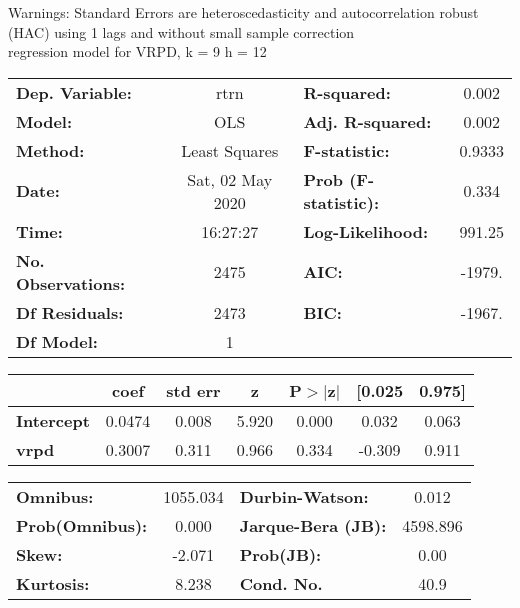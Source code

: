 Warnings: \newline
 [1] Standard Errors are heteroscedasticity and autocorrelation robust (HAC) using 1 lags and without small sample correction\\ 

regression model for VRPD, k = 9 h = 12\begin{center}
\begin{tabular}{lclc}
\toprule
\textbf{Dep. Variable:}    &       rtrn       & \textbf{  R-squared:         } &     0.002   \\
\textbf{Model:}            &       OLS        & \textbf{  Adj. R-squared:    } &     0.002   \\
\textbf{Method:}           &  Least Squares   & \textbf{  F-statistic:       } &    0.9333   \\
\textbf{Date:}             & Sat, 02 May 2020 & \textbf{  Prob (F-statistic):} &    0.334    \\
\textbf{Time:}             &     16:27:27     & \textbf{  Log-Likelihood:    } &    991.25   \\
\textbf{No. Observations:} &        2475      & \textbf{  AIC:               } &    -1979.   \\
\textbf{Df Residuals:}     &        2473      & \textbf{  BIC:               } &    -1967.   \\
\textbf{Df Model:}         &           1      & \textbf{                     } &             \\
\bottomrule
\end{tabular}
\begin{tabular}{lcccccc}
                   & \textbf{coef} & \textbf{std err} & \textbf{z} & \textbf{P$> |$z$|$} & \textbf{[0.025} & \textbf{0.975]}  \\
\midrule
\textbf{Intercept} &       0.0474  &        0.008     &     5.920  &         0.000        &        0.032    &        0.063     \\
\textbf{vrpd}      &       0.3007  &        0.311     &     0.966  &         0.334        &       -0.309    &        0.911     \\
\bottomrule
\end{tabular}
\begin{tabular}{lclc}
\textbf{Omnibus:}       & 1055.034 & \textbf{  Durbin-Watson:     } &    0.012  \\
\textbf{Prob(Omnibus):} &   0.000  & \textbf{  Jarque-Bera (JB):  } & 4598.896  \\
\textbf{Skew:}          &  -2.071  & \textbf{  Prob(JB):          } &     0.00  \\
\textbf{Kurtosis:}      &   8.238  & \textbf{  Cond. No.          } &     40.9  \\
\bottomrule
\end{tabular}
\end{center}

